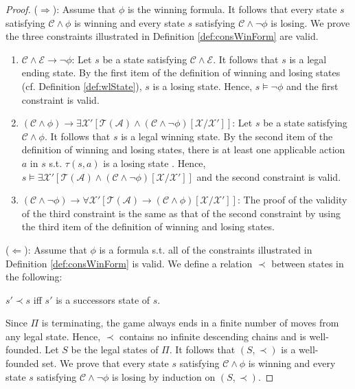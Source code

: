 \documentclass[review]{elsarticle}
\newcommand{\statevar}{\mathcal{X}}
\newcommand{\act}{\mathcal{A}}
\newcommand{\trans}{\mathcal{T}}
\newcommand{\constraint}{\mathcal{C}}
\newcommand{\estate}{\mathcal{E}}
\newcommand{\wfOrder}{\prec}
\begin{document}
	\begin{proof}
		($\Rightarrow$): Assume that $\phi$ is the winning formula.
		It follows that every state $s$ satisfying $\constraint \land \phi$ is winning and every state $s$ satisfying $\constraint \land \neg \phi$ is losing.	
		We prove the three constraints illustrated in Definition \ref{def:consWinForm} are valid.
		\begin{enumerate}
			\item $\constraint \land \estate \rightarrow \neg \phi$: 
			Let $s$ be a state satisfying $\constraint \land \estate$.
			It follows that $s$ is a legal ending state.
			By the first item of the definition of winning and losing states (cf. Definition \ref{def:wlState}), $s$ is a losing state.
			Hence, $s \models \neg \phi$ and the first constraint is valid.
				
			\item $(\constraint \land \phi) \rightarrow \exists \statevar' [\trans(\act) \land (\constraint \land \neg \phi)[\statevar/\statevar']]$: 
			Let $s$ be a state satisfying $\constraint \land \phi$.
			It follows that $s$ is a legal winning state.
			By the second item of the definition of winning and losing states, there is at least one applicable action $a$ in $s$ s.t. $\tau(s, a)$ is a losing state .
			Hence, $s \models \exists \statevar' [\trans(\act) \land (\constraint \land \neg \phi)[\statevar/\statevar']]$ and the second constraint is valid.
			
			\item $(\constraint \land \neg \phi) \rightarrow \forall \statevar' [\trans(\act) \rightarrow (\constraint \land \phi)[\statevar/\statevar']]$:
			The proof of the validity of the third constraint is the same as that of the second constraint by using the third item of the definition of winning and losing states.
		\end{enumerate}
				
		($\Leftarrow$): Assume that $\phi$ is a formula s.t. all of the constraints illustrated in Definition \ref{def:consWinForm} is valid.
		We define a relation $\wfOrder$ between states in the following:
		\begin{center}
			$s' \wfOrder s$ iff $s'$ is a successors state of $s$.
		\end{center}
		Since $\Pi$ is terminating, the game always ends in	a finite number of moves from any legal state.
		Hence, $\wfOrder$ contains no infinite descending chains and is well-founded.
		Let $S$ be the legal states of $\Pi$.
		It follows that $(S, \wfOrder)$ is a well-founded set.
		We prove that every state $s$ satisfying $\constraint \land \phi$ is winning and every state $s$ satisfying $\constraint \land \neg \phi$ is losing by induction on $(S, \wfOrder)$.
		

\end{proof}
\end{document}
